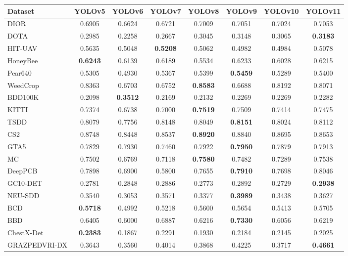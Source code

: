 \documentclass[runningheads]{llncs}
\begin{document}
\begin{table}[htbp]
\centering
\begin{tabular}{lccccccc}
\hline
Dataset & YOLOv5 & YOLOv6 & YOLOv7 & YOLOv8 & YOLOv9 & YOLOv10 & YOLOv11 \\
\hline
DIOR & 0.6905& 0.6624& 0.6721& 0.7009& 0.7051& 0.7024& 0.7053
\\
DOTA & 0.2985& 0.2258 & 0.2667 & 0.3045 & 0.3148 & 0.3065 & \textbf{0.3183} \\
HIT-UAV& 0.5635 & 0.5048 & \textbf{0.5208} & 0.5062 & 0.4982 & 0.4984 & 0.5078 \\
\hline
HoneyBee & \textbf{0.6243} & 0.6139 & 0.6189 & 0.5534 & 0.6233 & 0.6028 & 0.6215 \\
Pear640 & 0.5305 & 0.4930 & 0.5367 & 0.5399 & \textbf{0.5459} & 0.5289 & 0.5400 \\
WeedCrop & 0.8363 & 0.6703 & 0.6752 & \textbf{0.8583} & 0.6688 & 0.8192 & 0.8071 \\
\hline
BDD100K & 0.2098 & \textbf{0.3512} & 0.2169 & 0.2132 & 0.2269 & 0.2269 & 0.2282 \\
KITTI & 0.7374 & 0.6738 & 0.7000 & \textbf{0.7519} & 0.7509 & 0.7414 & 0.7475 \\
TSDD & 0.8079 & 0.7756 & 0.8148 & 0.8049 & \textbf{0.8151} & 0.8024 & 0.8112 \\
\hline
CS2 & 0.8748 & 0.8448 & 0.8537 & \textbf{0.8920} & 0.8840 & 0.8695 & 0.8653 \\
GTA5 & 0.7829 & 0.7930 & 0.7460 & 0.7922 & \textbf{0.7950} & 0.7879 & 0.7913 \\
MC & 0.7502 & 0.6769 & 0.7118 & \textbf{0.7580} & 0.7482 & 0.7289 & 0.7538 \\
\hline
DeepPCB & 0.7898 & 0.6900 & 0.5800 & 0.7655 & \textbf{0.7910} & 0.7698 & 0.8046 \\
GC10-DET & 0.2781 & 0.2848 & 0.2886 & 0.2773 & 0.2892 & 0.2729 & \textbf{0.2938} \\
NEU-SDD & 0.3540 & 0.3053 & 0.3571 & 0.3377 & \textbf{0.3989} & 0.3438 & 0.3627 \\
\hline
BCD & \textbf{0.5718} &0.4992& 0.5218 & 0.5600 & 0.5654 & 0.5413 & 0.5705 \\
BBD & 0.6405 & 0.6000 & 0.6887 & 0.6216 & \textbf{0.7330} & 0.6056 & 0.6219 \\
ChestX-Det & \textbf{0.2383} & 0.1867 & 0.2291 & 0.1930 & 0.2184 & 0.2145 & 0.2025 \\
GRAZPEDVRI-DX & 0.3643 & 0.3560 & 0.4014 & 0.3868 & 0.4225 & 0.3717 & \textbf{0.4661} \\

\end{tabular}
\end{table}
\end{document}
